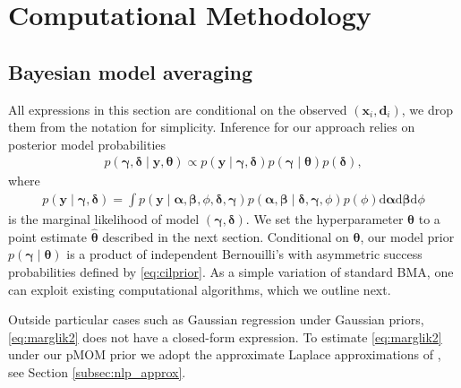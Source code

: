\documentclass[12pt]{article}
\newcommand{\mb}[1]{\mathbf{#1}}
\newcommand{\by}{{\mb{y}}}
\newcommand{\bd}{{\mb{d}}}
\newcommand{\bx}{{\mb{x}}}
\newcommand{\balpha}{{\bm{\alpha}}}
\newcommand{\bbeta}{{\bm{\beta}}}
\newcommand{\bgamma}{{\bm{\gamma}}}
\newcommand{\bdelta}{{\bm{\delta}}}
\newcommand{\btheta}{{\bm{\theta}}}
\begin{document}

\section{Computational Methodology} \label{sec:comput}

\subsection{Bayesian model averaging} \label{ssec:bma}

All expressions in this section are conditional on the observed $(\bx_i,\bd_i)$, we drop them from the notation for simplicity.
Inference for our approach relies on
posterior model probabilities
\begin{align}
\nonumber
p(\bgamma, \bdelta \mid \by, \btheta) \propto p(\by \mid \bgamma, \bdelta) p(\bgamma \mid \btheta) p(\bdelta),
\nonumber
\end{align}
where
\begin{align}
p(\by \mid \bgamma, \bdelta) = \int p(\by \mid \balpha, \bbeta, \phi, \bdelta, \bgamma) p(\balpha, \bbeta \mid \bdelta, \bgamma, \phi) p(\phi) \text{d}\balpha \text{d}\bbeta \text{d}\phi \label{eq:marglik2}
\end{align}
is the marginal likelihood of model $(\bgamma,\bdelta)$.
We set the hyperparameter $\btheta$ to a point estimate $\hat{\btheta}$ described in the next section.
Conditional on $\btheta$, our model prior $p(\bgamma \mid \btheta)$ is a product of independent Bernouilli's with asymmetric success probabilities defined by \eqref{eq:cilprior}. As a simple variation of standard BMA, one can exploit existing computational algorithms, which we outline next.

Outside particular cases such as Gaussian regression under Gaussian priors, \eqref{eq:marglik2} does not have a closed-form expression.
To estimate \eqref{eq:marglik2} under our pMOM prior we adopt the approximate Laplace approximations of \cite{Rossell20a}, %
see Section \ref{subsec:nlp_approx}.
\end{document}
